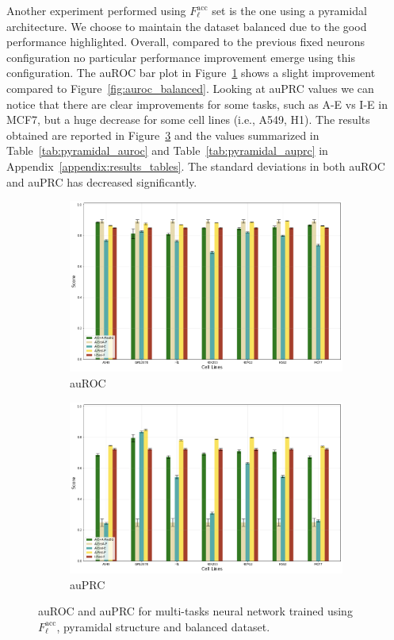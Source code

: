 Another experiment performed using $F_\ell^{\textrm{acc}}$ set is the one using a pyramidal architecture. We choose to maintain the dataset balanced due to the good performance highlighted. Overall, compared to the previous fixed neurons configuration no particular performance improvement emerge using this configuration. The auROC bar plot in Figure~\ref{fig:auroc_pyramydal} shows a slight improvement compared to Figure~\ref{fig:auroc_balanced}. Looking at auPRC values we can notice that there are clear improvements for some tasks, such as A-E vs I-E in MCF7, but a huge decrease for some cell lines (i.e., A549, H1). The results obtained are reported in Figure~\ref{fig:pyramydal_results} and the values summarized in Table~\ref{tab:pyramidal_auroc} and Table~\ref{tab:pyramidal_auprc} in Appendix~\ref{appendix:results_tables}. The standard deviations in both auROC and auPRC has decreased significantly.  
\begin{figure}[!htbp]
    \centering
    \begin{subfigure}[b]{\textwidth}
        \includegraphics[width=\textwidth]{images/results_plots/pyramydal_auroc.png}
        \caption{auROC}
        \label{fig:auroc_pyramydal}
    \end{subfigure}
    \begin{subfigure}[b]{\textwidth}
        \includegraphics[width=\textwidth]{images/results_plots/pyramydal_auprc.png}
        \caption{auPRC}
        \label{fig:auprc_pyramydal}
    \end{subfigure}
    \caption{auROC and auPRC for multi-tasks neural network trained using $F_\ell^{\textrm{acc}}$, pyramidal structure and balanced dataset.}\label{fig:pyramydal_results}
\end{figure}
